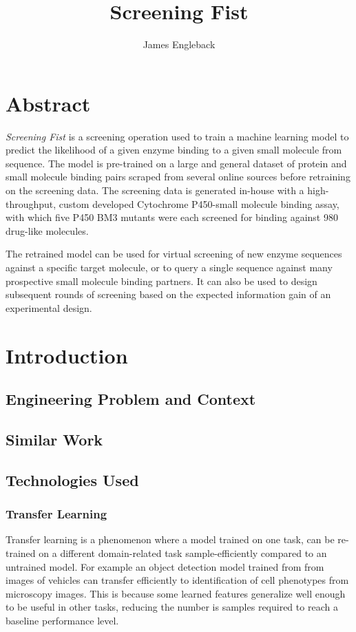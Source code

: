 \documentclass{article}
\begin{document}
\title{\textbf{Screening Fist}}
\author{James Engleback}
\maketitle
\tableofcontents

\section{Abstract}
\textit{Screening Fist} is a screening operation used to train a machine learning model to predict the likelihood of a given enzyme binding to a given small molecule from sequence.
The model is pre-trained on a large and general dataset of protein and small molecule binding pairs scraped from several online sources before retraining on the screening data.
The screening data is generated in-house with a high-throughput, custom developed Cytochrome P450-small molecule binding assay, with which five P450 BM3 mutants were each screened for binding against 980 drug-like molecules.
\par
The retrained model can be used for virtual screening of new enzyme sequences against a specific target molecule, or to query a single sequence against many prospective small molecule binding partners.
It can also be used to design subsequent rounds of screening based on the expected information gain of an experimental design.

\section{Introduction}

\subsection{Engineering Problem and Context}
\subsection{Similar Work}
\subsection{Technologies Used}

\subsubsection{Transfer Learning}

Transfer learning is a phenomenon where a model trained on one task, can be re-trained on a different domain-related task  sample-efficiently compared to an untrained model.
For example an object detection model trained from from images of vehicles can transfer efficiently to identification of cell phenotypes from microscopy images.
This is because some learned features generalize well enough to be useful in other tasks, reducing the number is samples required to reach a baseline performance level.
\end{document}
